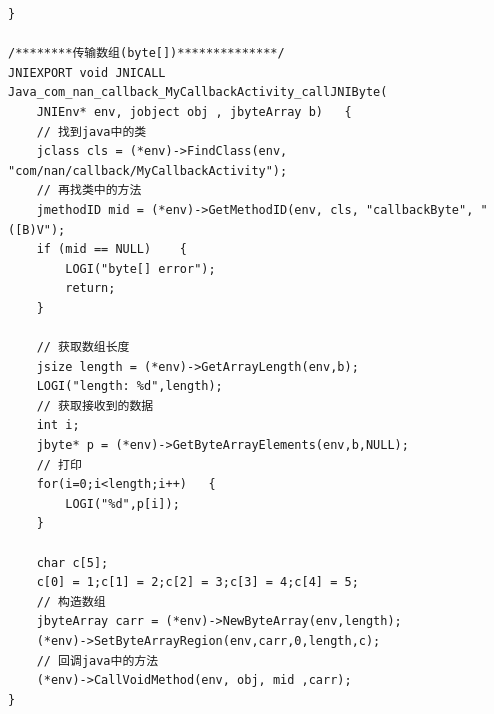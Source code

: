\documentclass[9pt, b5paper]{article}
\begin{document}
\begin{itemize}
\begin{verbatim}
}  
   
/********传输数组(byte[])**************/  
JNIEXPORT void JNICALL Java_com_nan_callback_MyCallbackActivity_callJNIByte(
    JNIEnv* env, jobject obj , jbyteArray b)   {  
    // 找到java中的类  
    jclass cls = (*env)->FindClass(env, "com/nan/callback/MyCallbackActivity");  
    // 再找类中的方法  
    jmethodID mid = (*env)->GetMethodID(env, cls, "callbackByte", "([B)V");  
    if (mid == NULL)    {  
        LOGI("byte[] error");  
        return;    
    }  
       
    // 获取数组长度  
    jsize length = (*env)->GetArrayLength(env,b);  
    LOGI("length: %d",length);      
    // 获取接收到的数据  
    int i;  
    jbyte* p = (*env)->GetByteArrayElements(env,b,NULL);  
    // 打印  
    for(i=0;i<length;i++)   {  
        LOGI("%d",p[i]);      
    }  
   
    char c[5];  
    c[0] = 1;c[1] = 2;c[2] = 3;c[3] = 4;c[4] = 5;  
    // 构造数组  
    jbyteArray carr = (*env)->NewByteArray(env,length);  
    (*env)->SetByteArrayRegion(env,carr,0,length,c);  
    // 回调java中的方法  
    (*env)->CallVoidMethod(env, obj, mid ,carr);  
}
\end{verbatim}
\end{itemize}
\end{document}
